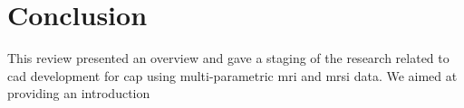 \section{Conclusion} \label{sec:conclusion}

This review presented an overview and gave a staging of the research related to \ac{cad} development for \ac{cap} using multi-parametric \ac{mri} and \ac{mrsi} data. We aimed at providing an introduction 